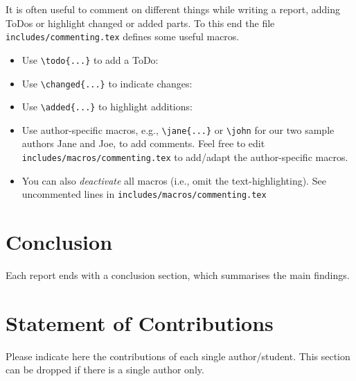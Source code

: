 \documentclass{MALEO_report}
\begin{document}
It is often useful to comment on different things while writing a report, adding ToDos or highlight changed or added parts. To this end the file \texttt{includes/commenting.tex} defines some useful macros.
\begin{itemize}
    \item Use \verb|\todo{...}| to add a ToDo:\newline {}
    \item Use \verb|\changed{...}| to indicate changes:\newline {}
    \item Use \verb|\added{...}| to highlight additions:\newline {}
    \item Use author-specific macros, e.g., \verb|\jane{...}| or \verb|\john| for our two sample authors Jane and Joe, to add comments. Feel free to edit \texttt{includes/macros/commenting.tex} to add/adapt the author-specific macros.\newline{}
    \newline
    \item You can also \emph{deactivate} all macros (i.e., omit the text-highlighting). See uncommented lines in \texttt{includes/macros/commenting.tex}
\end{itemize}

\section{Conclusion}

Each report ends with a conclusion section, which summarises the main findings. 

\section*{Statement of Contributions}

Please indicate here the contributions of each single author/student. This section can be dropped if there is a single author only.

\printbibliography
\end{document}
